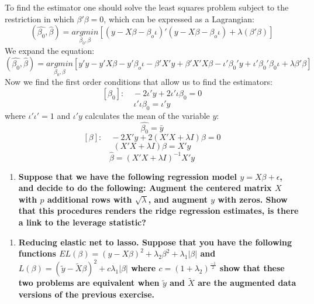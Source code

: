 \documentclass[12pt,onecolumn]{article}
\begin{document}
\\
\\
To find the estimator one should solve the least squares problem subject to the restriction in which $\beta'\beta=0$, which can be expressed as a Lagrangian:
\begin{equation*}
    \left(\hat{\beta_0},\hat{\beta}\right)=\underset{\beta_0,\beta}{argmin} \left[(y-X\beta-\beta_o\iota)'(y-X\beta-\beta_o\iota)+\lambda(\beta'\beta)\right]
\end{equation*}
We expand the equation:
\begin{equation*}
    \left(\hat{\beta_0},\hat{\beta}\right)=\underset{\beta_0,\beta}{argmin}\left[y'y-y'X\beta-y'\beta_o\iota-\beta'X'y+\beta'X'X\beta-\iota'\beta_0'y+\iota'\beta_0'\beta_0\iota+\lambda\beta'\beta\right]
\end{equation*}
Now we find the first order conditions that allow us to find the estimators:
\begin{equation*}
    \left[\beta_0\right]: \quad -2\iota'y+2\iota'\iota\beta_0=0
\end{equation*}
\begin{equation*}
    \iota'\iota\beta_0=\iota'y
\end{equation*}
where $\iota'\iota'=1$ and $\iota'y$ calculates the mean of the variable $y$:
\begin{equation*}
    \hat{\beta_0}=\bar{y}
\end{equation*}
\begin{equation*}
    \left[\beta\right]: \quad -2X'y+2(X'X+\lambda{I})\beta=0
\end{equation*}
\begin{equation*}
    (X'X+\lambda{I})\beta=X'y
\end{equation*}
\begin{equation*}
    \hat{\beta}=(X'X+\lambda{I})^{-1}X'y
\end{equation*}
\begin{enumerate}[resume]  
    \item \bf{Suppose that we have the following regression model  $y=X\beta +\epsilon$, and decide to do the following: Augment the centered matrix $X$ with $p$ additional rows with $\sqrt{\lambda}$, and augment $y$ with zeros. Show that this procedures renders the ridge regression estimates, is there a link to the leverage statistic?}
\end{enumerate}
\begin{enumerate}[resume]    
    \item \bf{Reducing elastic net to lasso. Suppose that you have the following functions $EL(\beta) = (y-X\beta)^2+ \lambda_2 \beta^2+ \lambda_1|\beta|$ and $L(\beta) = (\tilde{y}-\tilde{X}\beta)^2+ c \lambda_1|\beta|$ where $c=(1+\lambda_2)^{\frac{-1}{2}}$ show that these two problems are equivalent when $\tilde{y}$ and $\tilde{X}$ are the augmented data versions of the previous exercise.}
\end{enumerate}
\end{document}
